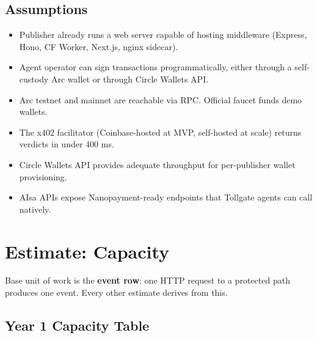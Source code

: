 \documentclass[11pt,a4paper]{article}
\newcommand{\iconChart}{\textcolor{tollgatearc}{\faChartLine}}
\begin{document}
\subsection{Assumptions}

\begin{itemize}[leftmargin=*]
  \item Publisher already runs a web server capable of hosting middleware (Express, Hono, CF Worker, Next.js, nginx sidecar).
  \item Agent operator can sign transactions programmatically, either through a self-custody Arc wallet or through Circle Wallets API.
  \item Arc testnet and mainnet are reachable via RPC. Official faucet funds demo wallets.
  \item The x402 facilitator (Coinbase-hosted at MVP, self-hosted at scale) returns verdicts in under 400 ms.
  \item Circle Wallets API provides adequate throughput for per-publisher wallet provisioning.
  \item AIsa APIs expose Nanopayment-ready endpoints that Tollgate agents can call natively.
\end{itemize}

\newpage

\section{Estimate: Capacity}

\begin{flowbox}[title={\iconChart~ Sizing the system}]
Base unit of work is the \textbf{event row}: one HTTP request to a protected path produces one event. Every other estimate derives from this.
\end{flowbox}

\subsection{Year 1 Capacity Table}
\end{document}
